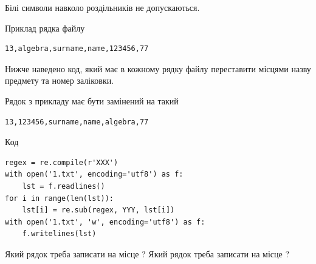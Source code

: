 \documentclass[12pt, ukrainian]{article}
\begin{document}
{Білі символи навколо роздільників не допускаються.

Приклад рядка файлу



\begin{verbatim}
13,algebra,surname,name,123456,77
\end{verbatim}


Нижче наведено код, який має в кожному рядку файлу переставити місцями назву предмету та номер заліковки.

Рядок з прикладу має бути замінений на такий



\begin{verbatim}
13,123456,surname,name,algebra,77
\end{verbatim}




Код



\begin{verbatim}
regex = re.compile(r'XXX')
with open('1.txt', encoding='utf8') as f:
    lst = f.readlines()
for i in range(len(lst)):
    lst[i] = re.sub(regex, YYY, lst[i])
with open('1.txt', 'w', encoding='utf8') as f:
    f.writelines(lst)
\end{verbatim}





Який рядок треба записати на місце  ?
Який рядок треба записати на місце  ?\par

}
\end{document}
